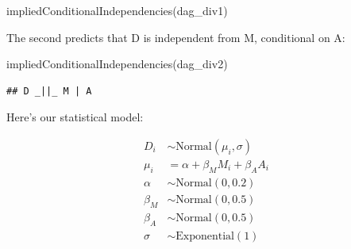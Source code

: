 \documentclass[
]{book}
\newenvironment{Shaded}{\begin{snugshade}}{\end{snugshade}}
\newcommand{\FunctionTok}[1]{\textcolor[rgb]{0.00,0.00,0.00}{#1}}
\newcommand{\NormalTok}[1]{#1}
\begin{document}
\begin{Shaded}
\begin{Highlighting}[]
\FunctionTok{impliedConditionalIndependencies}\NormalTok{(dag\_div1)}
\end{Highlighting}
\end{Shaded}

The second predicts that D is independent from M, conditional on A:

\begin{Shaded}
\begin{Highlighting}[]
\FunctionTok{impliedConditionalIndependencies}\NormalTok{(dag\_div2)}
\end{Highlighting}
\end{Shaded}

\begin{verbatim}
## D _||_ M | A
\end{verbatim}

Here's our statistical model:

\[
\begin{aligned}
D_i &\sim \text{Normal}(\mu_i, \sigma) \\
\mu_i &= \alpha + \beta_M M_i + \beta_A A_i \\
\alpha &\sim \text{Normal}(0, 0.2) \\ 
\beta_M &\sim \text{Normal}(0, 0.5) \\
\beta_A &\sim \text{Normal}(0, 0.5) \\
\sigma &\sim \text{Exponential}(1) \\
\end{aligned}
\]
\end{document}

